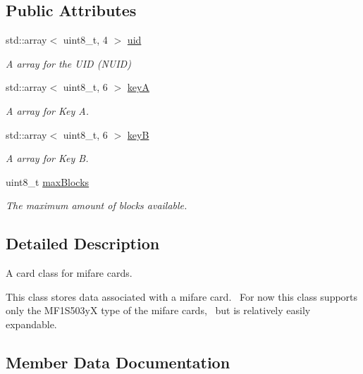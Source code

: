 \subsection*{Public Attributes}
\begin{DoxyCompactItemize}
\item 
std\+::array$<$ uint8\+\_\+t, 4 $>$ \hyperlink{classmifare_1_1card_a0f97900bf64b956ac9f9622671aa4f74}{uid}
\begin{DoxyCompactList}\small\item\em A array for the U\+ID (N\+U\+ID) \end{DoxyCompactList}\item 
std\+::array$<$ uint8\+\_\+t, 6 $>$ \hyperlink{classmifare_1_1card_a9d6bb609c82ca6fa65a79e83656db964}{keyA}
\begin{DoxyCompactList}\small\item\em A array for Key A. \end{DoxyCompactList}\item 
std\+::array$<$ uint8\+\_\+t, 6 $>$ \hyperlink{classmifare_1_1card_ae99191bf1a9478b61f4b0043c6e0d7bf}{keyB}
\begin{DoxyCompactList}\small\item\em A array for Key B. \end{DoxyCompactList}\item 
uint8\+\_\+t \hyperlink{classmifare_1_1card_a3283a205a271075bd6e4b0bea3f015cb}{max\+Blocks}
\begin{DoxyCompactList}\small\item\em The maximum amount of blocks available. \end{DoxyCompactList}\end{DoxyCompactItemize}


\subsection{Detailed Description}
A card class for mifare cards. 

This class stores data associated with a mifare card.~\newline
For now this class supports only the M\+F1\+S503yX type of the mifare cards,~\newline
but is relatively easily expandable. 

\subsection{Member Data Documentation}
\mbox{\label{classmifare_1_1card_a9d6bb609c82ca6fa65a79e83656db964}} 
